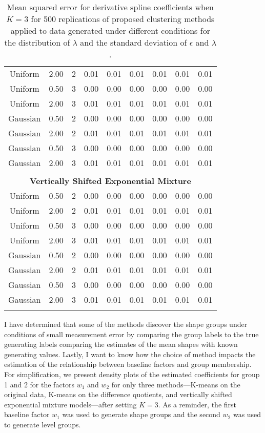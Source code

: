 \begin{table}[ht]
\begin{center}
\begin{tabular}{ccc|cccccc}
  Uniform & 2.00 &   2 & 0.01 & 0.01 & 0.01 & 0.01 & 0.01 & 0.01 \\ 
  Uniform & 0.50 &   3 & 0.00 & 0.00 & 0.00 & 0.00 & 0.00 & 0.00 \\ 
  Uniform & 2.00 &   3 & 0.01 & 0.01 & 0.01 & 0.01 & 0.01 & 0.01 \\ 
  Gaussian & 0.50 &   2 & 0.00 & 0.00 & 0.00 & 0.00 & 0.00 & 0.00 \\ 
  Gaussian & 2.00 &   2 & 0.01 & 0.01 & 0.01 & 0.01 & 0.01 & 0.01 \\ 
  Gaussian & 0.50 &   3 & 0.00 & 0.00 & 0.00 & 0.00 & 0.00 & 0.00 \\ 
  Gaussian & 2.00 &   3 & 0.01 & 0.01 & 0.01 & 0.01 & 0.01 & 0.01 \\ 
   \\ \multicolumn{9}{c}{\textbf{Vertically Shifted Exponential Mixture}}\\Uniform & 0.50 &   2 & 0.00 & 0.00 & 0.00 & 0.00 & 0.00 & 0.00 \\ 
  Uniform & 2.00 &   2 & 0.01 & 0.01 & 0.01 & 0.01 & 0.01 & 0.01 \\ 
  Uniform & 0.50 &   3 & 0.00 & 0.00 & 0.00 & 0.00 & 0.00 & 0.00 \\ 
  Uniform & 2.00 &   3 & 0.01 & 0.01 & 0.01 & 0.01 & 0.01 & 0.01 \\ 
  Gaussian & 0.50 &   2 & 0.00 & 0.00 & 0.00 & 0.00 & 0.00 & 0.00 \\ 
  Gaussian & 2.00 &   2 & 0.01 & 0.01 & 0.01 & 0.01 & 0.01 & 0.01 \\ 
  Gaussian & 0.50 &   3 & 0.00 & 0.00 & 0.00 & 0.00 & 0.00 & 0.00 \\ 
  Gaussian & 2.00 &   3 & 0.01 & 0.01 & 0.01 & 0.01 & 0.01 & 0.01 \\ 
   \thickhline\end{tabular}
\caption{Mean squared error for derivative spline coefficients when $K=3$ for 500 replications of proposed clustering methods applied to data generated under different conditions for the distribution of $\lambda$ and the standard deviation of $\epsilon$ and $\lambda$.}
\label{tab:mse3}
\end{center}
\end{table}
I have determined that some of the methods discover the shape groups under conditions of small measurement error by comparing the group labels to the true generating labels comparing the estimates of the mean shapes with known generating values. Lastly, I want to know how the choice of method impacts the estimation of the relationship between baseline factors and group membership. For simplification, we present density plots of the estimated coefficients for group 1 and 2 for the factors $w_{1}$ and $w_{2}$ for only three methods---K-means on the original data, K-means on the difference quotients, and vertically shifted exponential mixture models---after setting $K=3$. As a reminder, the first baseline factor $w_{1}$ was used to generate shape groups and the second $w_{2}$ was used to generate level groups. 

